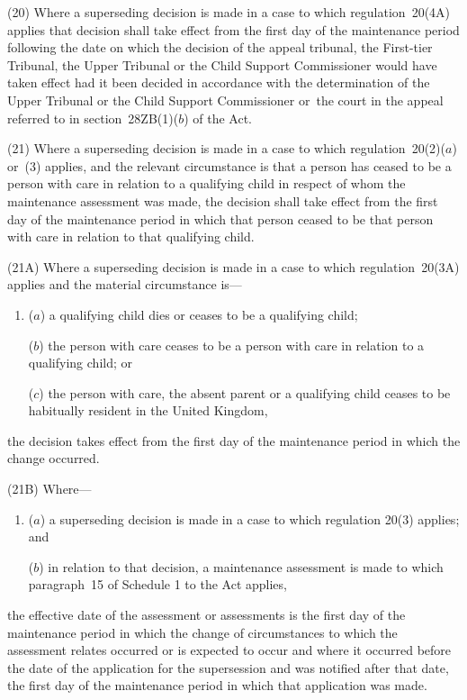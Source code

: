 \documentclass[a4paper,12pt]{article}
\begin{document}
(20) Where a superseding decision is made in a case to which regulation~20(4A) applies that decision shall take effect from the first day of the maintenance period following the date on which the 
decision of the appeal tribunal, the First-tier Tribunal, the Upper Tribunal or the Child Support Commissioner  %
would have taken effect had it been decided in accordance with the determination of the 
Upper Tribunal  %
or the Child Support Commissioner  %
or~the court in the appeal referred to in section~28ZB(1)($b$)  of the Act.

(21) Where a superseding decision is made in a case to which regulation~20(2)($a$)  or~(3) applies, and the relevant circumstance is that a person has ceased to be a person with care in relation to a qualifying child in respect of whom the maintenance assessment was made, the decision shall take effect from the first day of the maintenance period in which that person ceased to be that person with care in relation to that qualifying child.

(21A) Where a superseding decision is made in a case to which regulation~20(3A) applies and the material circumstance is—
\begin{enumerate}\item[]
($a$) a qualifying child dies or ceases to be a qualifying child;

($b$) the person with care ceases to be a person with care in relation to a qualifying child; or

($c$) the person with care, the absent parent or a qualifying child ceases to be habitually resident in the United Kingdom,
\end{enumerate}
the decision takes effect from the first day of the maintenance period in which the change occurred.

(21B) Where—
\begin{enumerate}\item[]
($a$) a superseding decision is made in a case to which regulation 20(3) applies; and

($b$) in relation to that decision, a maintenance assessment is made to which paragraph~15 of Schedule 1 to the Act applies,
\end{enumerate}
the effective date of the assessment or assessments is the first day of the maintenance period in which the change of circumstances to which the assessment relates occurred or is expected to occur and where it occurred before the date of the application for the supersession and was notified after that date, the first day of the maintenance period in which that application was made.
\end{document}
